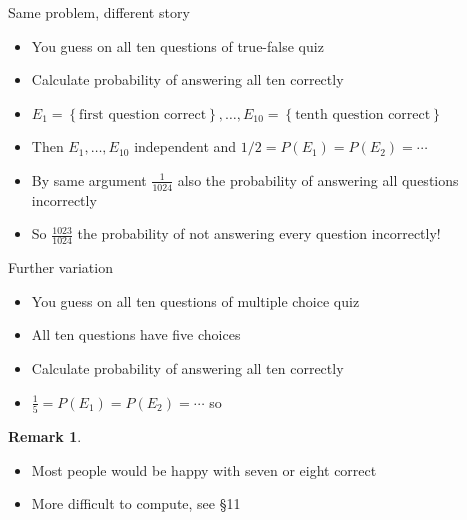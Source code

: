 \documentclass{beamer}
\theoremstyle{definition}
\newtheorem{remark}{Remark}
\begin{document}
\begin{frame}{Same problem, different story}
\begin{itemize}
\item You guess on all ten questions of true-false quiz
\item Calculate probability of answering all ten correctly
\item $E_1=\left\{\text{first question correct}\right\},\ldots,
E_{10}=\left\{\text{tenth question correct}\right\}$
\item Then $E_1,\ldots,E_{10}$ independent
and $1/2=P\left(E_1\right)=P\left(E_2\right)=\cdots$
\item By same argument $\frac{1}{1024}$ also the probability
of answering all questions \alert{incorrectly}
\item So $\frac{1023}{1024}$ the probability of
\alert{not} answering every question incorrectly!
\end{itemize}
\end{frame}

\begin{frame}{Further variation}
\begin{itemize}
\item You guess on all ten questions of multiple choice quiz
\item All ten questions have five choices
\item Calculate probability of answering all ten correctly
\item $\frac{1}{5}=P\left(E_1\right)=P\left(E_2\right)=\cdots$ so
\end{itemize}
\begin{remark}
\begin{itemize}
\item Most people would be happy with seven or eight correct
\item More difficult to compute, see \S11
\end{itemize}
\end{remark}
\end{frame}
\end{document}
